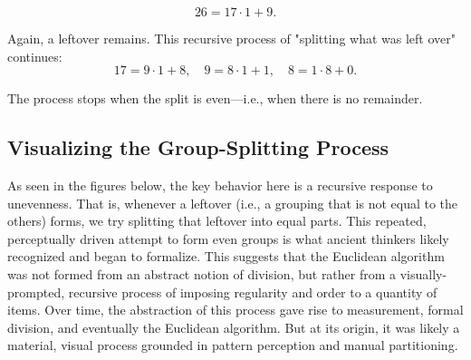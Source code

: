 \documentclass{article}
\begin{document}
\[ 26 = 17 \cdot 1 + 9. \]

Again, a leftover remains. This recursive process of "splitting what was left over" continues:
\[ 17 = 9 \cdot 1 + 8, \quad 9 = 8 \cdot 1 + 1, \quad 8 = 1 \cdot 8 + 0. \]

The process stops when the split is even—i.e., when there is no remainder.

\subsection*{Visualizing the Group-Splitting Process}
As seen in the figures below, the key behavior here is a recursive response to unevenness. That is, whenever a leftover (i.e., a grouping that is not equal to the others) forms, we try splitting that leftover into equal parts. This repeated, perceptually driven attempt to form even groups is what ancient thinkers likely recognized and began to formalize. This suggests that the Euclidean algorithm was not formed from an abstract notion of division, but rather from a visually-prompted, recursive process of imposing regularity and order to a quantity of items. Over time, the abstraction of this process gave rise to measurement, formal division, and eventually the Euclidean algorithm. But at its origin, it was likely a material, visual process grounded in pattern perception and manual partitioning.


\def\nodesize{4pt}
\end{document}
